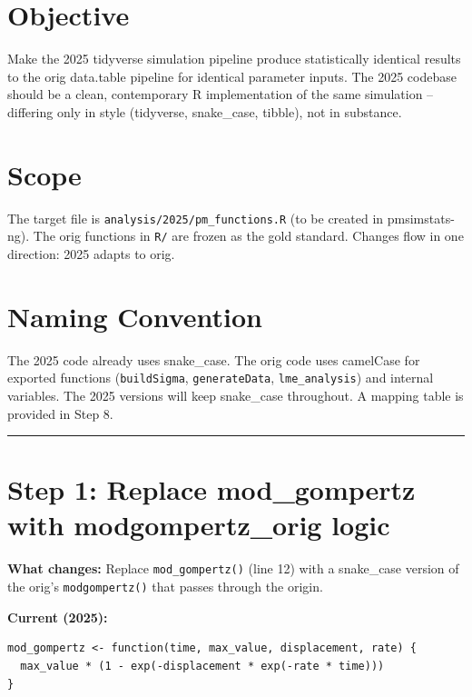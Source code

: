 \documentclass[11pt]{article}
\begin{document}
\maketitle
\thispagestyle{fancy}
\tableofcontents

\section{Objective}

Make the 2025 tidyverse simulation pipeline produce statistically
identical results to the orig data.table pipeline for identical
parameter inputs. The 2025 codebase should be a clean, contemporary
R implementation of the same simulation -- differing only in style
(tidyverse, snake\_case, tibble), not in substance.

\section{Scope}

The target file is \texttt{analysis/2025/pm\_functions.R} (to be created
in pmsimstats-ng). The orig functions in \texttt{R/} are frozen as the
gold standard. Changes flow in one direction: 2025 adapts to orig.

\section{Naming Convention}

The 2025 code already uses snake\_case. The orig code uses camelCase
for exported functions (\texttt{buildSigma}, \texttt{generateData}, \texttt{lme\_analysis})
and internal variables. The 2025 versions will keep snake\_case
throughout. A mapping table is provided in Step 8.

\bigskip\noindent\rule{\textwidth}{0.4pt}\bigskip

\section{Step 1: Replace mod\_gompertz with modgompertz\_orig logic}

\textbf{What changes:} Replace \texttt{mod\_gompertz()} (line 12) with a
snake\_case version of the orig's \texttt{modgompertz()} that passes
through the origin.

\textbf{Current (2025):}
\begin{lstlisting}
mod_gompertz <- function(time, max_value, displacement, rate) {
  max_value * (1 - exp(-displacement * exp(-rate * time)))
}
\end{lstlisting}
\end{document}

